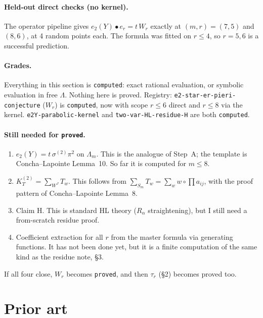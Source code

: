 \documentclass[11pt]{article}
\newcommand{\grade}[1]{\texttt{#1}}
\begin{document}
\paragraph{Held-out direct checks (no kernel).} The operator pipeline gives $e_2(Y)\bullet e_r=t\,W_r$ exactly at $(m,r)=(7,5)$ and $(8,6)$, at 4 random points each. The formula was fitted on $r\le4$, so $r=5,6$ is a successful prediction.

\paragraph{Grades.} Everything in this section is \grade{computed}: exact rational evaluation, or symbolic evaluation in free $\Lambda$. Nothing here is proved. Registry: \texttt{e2-star-er-pieri-conjecture} ($W_r$) is \grade{computed}, now with scope $r\le6$ direct and $r\le8$ via the kernel. \texttt{e2Y-parabolic-kernel} and \texttt{two-var-HL-residue-H} are both \grade{computed}.

\paragraph{Still needed for \grade{proved}.}
\begin{enumerate}
\item $e_2(Y)=t\,\sigma^{(2)}\pi^2$ on $\Lambda_m$. This is the analogue of Step~A; the template is Concha--Lapointe Lemma~10. So far it is computed for $m\le8$.
\item $K^{(2)}_T=\sum_{W^J}T_w$. This follows from $\sum_{S_m}T_w=\sum_ww\circ\prod a_{ij}$, with the proof pattern of Concha--Lapointe Lemma~8.
\item Claim H. This is standard HL theory ($R_\alpha$ straightening), but I still need a from-scratch residue proof.
\item Coefficient extraction for all $r$ from the master formula via generating functions. It has not been done yet, but it is a finite computation of the same kind as the residue note, \S3.
\end{enumerate}
If all four close, $W_r$ becomes \grade{proved}, and then $\tau_r$ (\S2) becomes proved too.

\section{Prior art}
\end{document}
